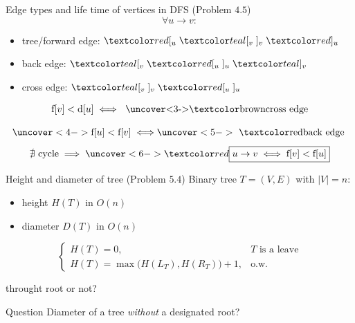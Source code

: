 \begin{frame}{}
  \begin{exampleblock}{Edge types and life time of vertices in DFS (Problem $4.5$)}
    \[
      \forall u \to v:
    \]
    \vspace{-0.30cm}
    \begin{itemize}
      \item tree/forward edge: $\red{[_{u}}\; \teal{[_{v}\; ]_{v}}\; \red{]_{u}}$
      \item back edge: $\teal{[_{v}}\; \red{[_{u}\; ]_{u}}\; \teal{]_{v}}$
      \item cross edge: $\teal{[_{v}\; ]_{v}}\; \red{[_{u}\; ]_{u}}$
    \end{itemize}
  \end{exampleblock}

  \pause
  \[
    \text{f}[v] < \text{d}[u] \iff \text{ \uncover<3->{\brown{cross}} edge}
  \]


  \[
    \uncover<4->{\text{f}[u] < \text{f}[v] \iff } \uncover<5->{\text{ \red{back} edge }}
  \]
  \[
    \nexists \text{ cycle} \implies \uncover<6->{\red{\boxed{u \to v \iff \text{f}[v] < \text{f}[u]}}}
  \]
\end{frame}
\begin{frame}{}
  \begin{exampleblock}{Height and diameter of tree (Problem $5.4$)}
    Binary tree $T = (V, E)$ with $|V| = n$:
    \begin{itemize}
      \item height $H(T)$ in $O(n)$
      \item diameter $D(T)$ in $O(n)$
    \end{itemize}
  \end{exampleblock}

  \pause
  \vspace{0.30cm}
  \[
    \left\{\begin{array}{ll}
      H(T) = 0, & T \text{ is a leave} \\
      H(T) = \max\Big(H(L_T), H(R_T)\Big) + 1, & \text{o.w.}
    \end{array}\right.
  \]
  \centerline{throught root or not?}

  \pause
  \vspace{0.50cm}
  \begin{alertblock}{Question}
	Diameter of a tree \emph{without} a designated root?
  \end{alertblock}
\end{frame}
